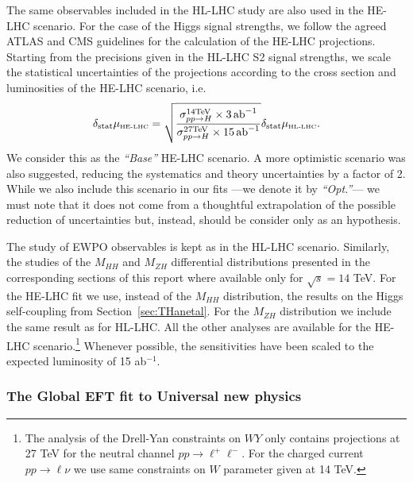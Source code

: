 The same observables included in the HL-LHC study are also used in the HE-LHC scenario. 
For the case of the Higgs signal strengths, we follow the agreed ATLAS and CMS guidelines for the calculation of
the HE-LHC projections.
Starting from the precisions given in the HL-LHC S2 signal strengths, we scale the statistical uncertainties of the projections
according to the cross section and luminosities of the HE-LHC scenario, i.e.
%
\begin{equation}
\delta_{\mathrm{stat}} \mu_{\mbox{\tiny HE-LHC}} = \sqrt{\frac{\sigma_{pp\to H}^{\mathrm{14 TeV}}\times 3~\!\mathrm{ab}^{-1}}{\sigma_{pp\to H}^{\mathrm{27 TeV}}\times 15~\! \mathrm{ab}^{-1}}} \delta_{\mathrm{stat}} \mu_{\mbox{\tiny HL-LHC}} .
\end{equation}
%
We consider this as the {\it ``Base''} HE-LHC scenario. A more optimistic scenario was also suggested, reducing the 
systematics and theory uncertainties by a factor of 2. While we also include this scenario in our fits ---we denote it by {\it ``Opt.''}---
we must note that it does not come from a thoughtful extrapolation of the possible reduction of uncertainties but, instead, 
should be consider only as an hypothesis.

The study of EWPO observables is kept as in the HL-LHC scenario. Similarly, the studies of the $M_{HH}$ and $M_{ZH}$ differential distributions presented in the corresponding sections of this report where available only for $\sqrt{s}=14$ TeV. For the HE-LHC fit we use, instead of the $M_{HH}$ distribution, the results on the Higgs self-coupling from Section~\ref{sec:THanetal}. For  the $M_{ZH}$ distribution we include the same result as for HL-LHC. All the other analyses are available for the HE-LHC scenario.\footnote{The analysis of the Drell-Yan constraints on $WY$ only contains projections at 27 TeV for the neutral channel $pp\to \ell^+ \ell^-$. For the charged current $pp\to \ell \nu$ we use same constraints on $W$ parameter given at 14 TeV.} Whenever possible, the sensitivities have been scaled to the
expected luminosity of 15 ab$^{-1}$.


\subsubsection*{The Global EFT fit to Universal new physics}
\label{sec:results}

